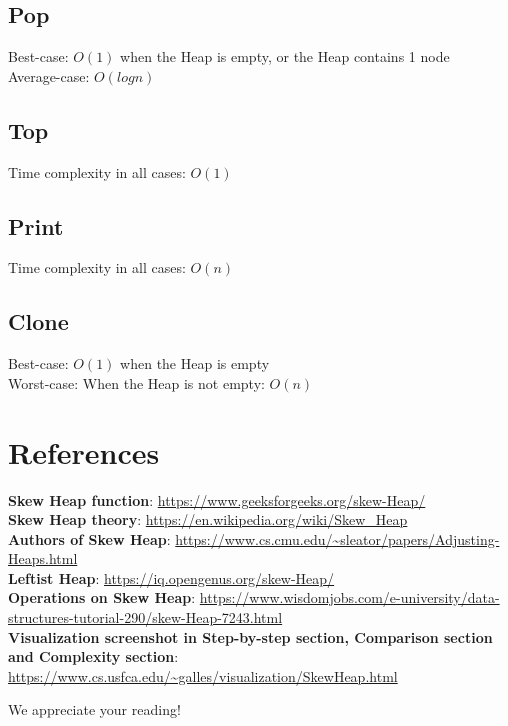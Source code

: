\documentclass[12pt, a4paper]{article}
\begin{document}
\subsection{Pop}
Best-case: $O(1)$ when the Heap is empty, or the Heap contains 1 node\\
Average-case: $O(log n) $


\subsection{Top}
Time complexity in all cases: $O(1)$


\subsection{Print}
Time complexity in all cases: $O(n)$


\subsection{Clone}
Best-case: $O(1)$ when the Heap is empty\\
Worst-case: When the Heap is not empty: $O(n)$


\pagebreak

\section{References}

\textbf{Skew Heap function}: \url{https://www.geeksforgeeks.org/skew-Heap/}\\
\textbf{Skew Heap theory}: \url{https://en.wikipedia.org/wiki/Skew_Heap}\\
\textbf{Authors of Skew Heap}: \url{https://www.cs.cmu.edu/~sleator/papers/Adjusting-Heaps.html}\\
\textbf{Leftist Heap}: \url{https://iq.opengenus.org/skew-Heap/}\\
\textbf{Operations on Skew Heap}: \url{https://www.wisdomjobs.com/e-university/data-structures-tutorial-290/skew-Heap-7243.html}\\
\textbf{Visualization screenshot in Step-by-step section, Comparison section and Complexity section}: \url{https://www.cs.usfca.edu/~galles/visualization/SkewHeap.html}

\bigskip
\bigskip
\bigskip

\begin{center}
    \LARGE{We appreciate your reading!}
\end{center}
\let\origdoublepage\cleardoublepage
\newcommand{\clearemptydoublepage}{%
  \clearpage
  {\pagestyle{empty}\origdoublepage}%
}
\end{document}
